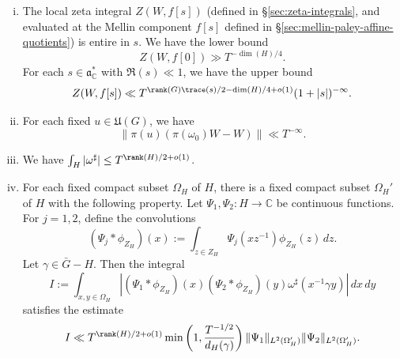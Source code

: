 \begin{theorem}
\begin{enumerate}[(i)]
    \begin{equation*}
      \nu_{\mathcal{D},\ell,T}(f) \ll T^{o(1)}.
    \end{equation*}
  \item \label{itm:sub-gln:8} The local zeta integral $Z(W,f[s])$ (defined in \S\ref{sec:zeta-integrals}, and evaluated at the Mellin component $f[s]$ defined in \S\ref{sec:mellin-paley-affine-quotients}) is entire in $s$.  We have the lower bound
    \begin{equation*}
      Z(W,f[0]) \gg T^{- \dim(H)/4}.
    \end{equation*}
    For each $s \in \mathfrak{a}_{\mathbb{C}}^*$ with $\Re(s) \ll 1$, we have the upper bound
    \begin{equation*}
      Z(W,f[s]) \ll  T^{\rank(G) \trace(s)/2 - \dim(H)/4 + o(1) }
      (1 + |s|)^{-\infty }.
    \end{equation*}
  \item \label{itm:sub-gln:1} For each fixed $u \in \mathfrak{U}(G)$, we have
    \begin{equation*}
      \|\pi(u) ( \pi(\omega_0) W - W)\| \ll T^{-\infty}.
    \end{equation*}
  \item \label{itm:sub-gln:f-L-one-H}   We have $\int_{H} |\omega^\sharp| \leq T^{\rank(H)/2 + o(1)}$.
  \item \label{itm:sub-gln:3}  For each fixed compact subset $\Omega_H$ of $H$, there is a fixed compact subset $\Omega_H'$ of $H$ with the following property.  Let $\Psi_1, \Psi_2 : H \rightarrow \mathbb{C}$ be continuous functions.  For $j=1,2$, define the convolutions
    \begin{equation*}
      (\Psi_j \ast \phi_{Z_H})(x) := \int_{z \in Z_H} \Psi_j(x z^{-1}) \phi_{Z_H}(z) \, d z.
    \end{equation*}
    Let $\gamma \in \bar{G} - H$.  Then the integral
    \begin{equation}\label{eq:i-:=-int-1}
      I := \int_{x, y \in \Omega_H }
      \left\lvert
        (\Psi_1 \ast \phi_{Z_H})(x)
        (\Psi_2 \ast \phi_{Z_H})(y)
        \omega^\sharp(x^{-1} \gamma y)
      \right\rvert
      \, d x \, d y
    \end{equation}
    satisfies the estimate
    \begin{equation*}
      I \ll
      T^{\rank(H)/2 + o(1)}
      \min\left( 1,
        \frac{T^{-1/2}}{ d_H(\gamma)}
      \right)
      \|\Psi_1\|_{L^2(\Omega_H')}
      \|\Psi_2\|_{L^2(\Omega_H')}.
    \end{equation*}
  \end{enumerate}
\end{theorem}
